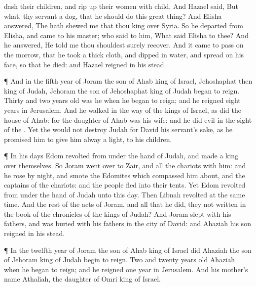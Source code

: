 {dash their
children, and rip
up their women with
child.
And
Hazael
said, But what,
{} thy
servant a
dog, that he should
do this
great
thing? And
Elisha
answered, The
{} hath
shewed me that thou
{}
king over
Syria.
So he
departed from
Elisha, and
came to his
master; who
said to him, What
said
Elisha to thee? And he
answered, He
told me
{} thou shouldest
surely
recover.
And it came to pass on the
morrow, that he
took a thick
cloth, and
dipped
{} in
water, and
spread
{} on his
face, so that he
died: and
Hazael
reigned in his stead.
\par }{\PP {}¶ And in the
fifth
year of
Joram the
son of
Ahab
king of
Israel,
Jehoshaphat
{} then
king of
Judah,
Jehoram the
son of
Jehoshaphat
king of
Judah began to
reign.
Thirty and
two
years
old was he when he began to
reign; and he
reigned
eight
years in
Jerusalem.
And he
walked in the
way of the
kings of
Israel, as
did the
house of
Ahab: for the
daughter of
Ahab was his
wife: and he
did
evil in the
sight of the
{}.
Yet the
{}
would not
destroy
Judah for
David his
servant’s sake, as he
promised him to
give him
alway a
light,
{} to his
children.
\par }{\PP {}¶ In his
days
Edom
revolted from under the
hand of
Judah, and
made a
king over themselves.
So
Joram went
over to
Zair, and all the
chariots with him: and he
rose by
night, and
smote the
Edomites which compassed him
about, and the
captains of the
chariots: and the
people
fled into their
tents.
Yet
Edom
revolted from under the
hand of
Judah unto this
day. Then
Libnah
revolted at the
same
time.
And the
rest of the
acts of
Joram, and all that he
did,
{} they not
written in the
book of the
chronicles of the
kings of
Judah?
And
Joram
slept with his
fathers, and was
buried with his
fathers in the
city of
David: and
Ahaziah his
son
reigned in his stead.
\par }{\PP {}¶ In the
twelfth
year of
Joram the
son of
Ahab
king of
Israel did
Ahaziah the
son of
Jehoram
king of
Judah begin to
reign.
Two and
twenty
years
old
{}
Ahaziah when he began to
reign; and he
reigned
one
year in
Jerusalem. And his
mother’s
name
{}
Athaliah, the
daughter of
Omri
king of
Israel.
}
